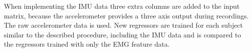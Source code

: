When implementing the IMU data three extra columns are added to the input matrix, because the accelerometer provides a three axis output during recordings. The raw accelerometer data is used. New regressors are trained for each subject similar to the described procedure, including the IMU data and is compared to the regressors trained with only the EMG feature data. 


%
%
%
%
%
%
%
%
%
%
